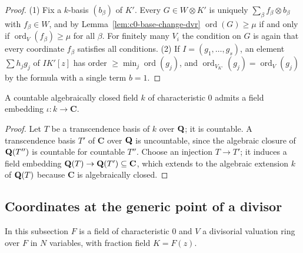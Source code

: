 \begin{proof}
(1) Fix a $k$-basis $(b_\beta)$ of $K'$. Every $G\in W\otimes K'$ is uniquely $\sum_\beta f_\beta\otimes b_\beta$ with $f_\beta\in W$, and by
Lemma~\ref{lem:c0-base-change-dvr} $\operatorname{ord}(G)\ge\mu$ if and only if $\operatorname{ord}_V(f_\beta)\ge\mu$ for all $\beta$. For finitely many
$V_i$ the condition on $G$ is again that every coordinate $f_\beta$ satisfies all conditions. (2) If $I=(g_1,\dots,g_s)$, an
element $\sum h_jg_j$ of $IK'[z]$ has order $\ge\min_j\operatorname{ord}(g_j)$, and $\operatorname{ord}_{V_{K'}}(g_j)=\operatorname{ord}_V(g_j)$ by the formula with a single
term $b=1$.
\end{proof}

\begin{lemma}\label{lem:c0-embedding}
\leanok
A countable algebraically closed field $k$ of characteristic $0$ admits a field embedding $\iota\colon k\to\mathbf C$.
\end{lemma}

\begin{proof}
Let $T$ be a transcendence basis of $k$ over $\mathbf{Q}$; it is countable. A transcendence basis $T'$ of $\mathbf C$ over $\mathbf{Q}$ is
uncountable, since the algebraic closure of $\mathbf{Q}(T'')$ is countable for countable $T''$. Choose an injection $T\to T'$;
it induces a field embedding $\mathbf{Q}(T)\to\mathbf{Q}(T')\subseteq\mathbf C$, which extends to the algebraic extension $k$ of $\mathbf{Q}(T)$ because
$\mathbf C$ is algebraically closed.
\end{proof}

\subsection{Coordinates at the generic point of a divisor}

In this subsection $F$ is a field of characteristic $0$ and $V$ a divisorial valuation ring over $F$ in $N$ variables, with
fraction field $K=F(z)$.

